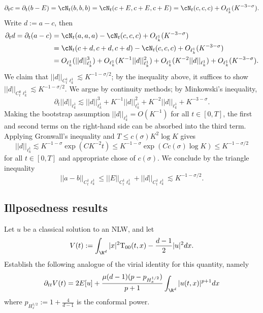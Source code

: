 \begin{solution}
		\[ \partial_t c = \partial_t (b - E) = \cN_t (b, b, b) = \cN_t (c + E, c + E, c + E) = \cN_t (c, c, c) + O_{\ell^1_k}(K^{-3 - \sigma}). \]	
	Write $d := a - c$, then 
		\begin{align*}
			\partial_t d = \partial_t (a - c) 
				&= \cN_t (a, a, a) - \cN_t (c, c, c) + O_{\ell^1_k}(K^{-3 - \sigma}) \\
				&= \cN_t (c + d, c + d, c + d) - \cN_t (c, c, c) + O_{\ell^1_k}(K^{-3 - \sigma}) \\
				&=O_{\ell^1_k}( ||d||_{\ell^1_k}^3) + O_{\ell^1_k}( K^{-1} ||d||_{\ell^1_k}^2)+ O_{\ell^1_k}( K^{-2} ||d||_{\ell^1_k})  + O_{\ell^1_k}( K^{-3 - \sigma}). 
			\end{align*}	
	We claim that $||d||_{C^1_t \ell^1_k} \lesssim K^{-1 - \sigma/2}$; by the inequality above, it suffices to show $||d||_{C^0_t \ell^1_k} \lesssim K^{-1 - \sigma/2}$. We argue by continuity methods; by Minkowski's inequality, 
		\[ \partial_t ||d||_{\ell^1_k} \lesssim  ||d||_{\ell^1_k}^3 +  K^{-1} ||d||_{\ell^1_k}^2+  K^{-2} ||d||_{\ell^1_k}  +  K^{-3 - \sigma}. \]	
	Making the bootstrap assumption $||d||_{\ell^1_k} = O(K^{-1})$ for all $t \in [0, T]$, the first and second terms on the right-hand side can be absorbed into the third term. Applying Gronwall's inequality and $T \leq c(\sigma) K^2 \log K$ gives
		\[ ||d||_{\ell^1_k} \lesssim K^{-1 - \sigma} \exp(C K^{-2} t) \leq K^{-1 - \sigma} \exp (C c(\sigma) \log K) \leq K^{-1 - \sigma/2} \]
	for all $t \in [0, T]$ and appropriate chose of $c(\sigma)$. We conclude by the triangle inequality
		\[ ||a - b||_{C^1_t \ell^1_k} \leq ||E||_{C^1_t\ell^1_k} + ||d||_{C^1_t\ell^1_k} \lesssim K^{-1 - \sigma/2}. \]
\end{solution}

\subsection{Illposedness results}

\begin{statement}
	Let $u$ be a classical solution to an NLW, and let 
		\[ V(t) := \int_{\R^d} |x|^2 \text{T}_{00} (t, x) - \frac{d - 1}{2} |u|^2 dx. \]
	Establish the following analogue of the virial identity for this quantity, namely
		\[ \partial_{tt} V(t) = 2 E[u] + \frac{\mu (d - 1) (p - p_{H^{1/2}_x})}{ p + 1} \int_{\R^d} |u(t, x)|^{p + 1} dx \]
	where $p_{H^{1/2}_x} := 1 + \frac{4}{d - 1}$ is the conformal power.		
\end{statement}

\begin{solution}

\end{solution}


